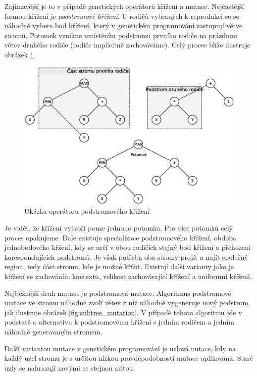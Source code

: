 Zajímavější je to v případě genetických operátorů křížení a mutace. Nejčastější formou
křížení je \textit{podstromové křížení}. U rodičů vybraných k reprodukci se se náhodně 
vybere bod křížení, který v genetickém programování zastupují větve stromu. Potomek
vznikne umístěním podstromu prvního rodiče na prázdnou větev druhého rodiče (rodiče
implicitně zachováváme). Celý proces blíže ilustruje obrázek \ref{fig:tree_crossover}

\begin{figure}[!ht]
	\centering
	\includegraphics[scale=0.6]{fig/tree_crossover}	
	\caption{Ukázka operátoru podstromového křížení}
	\label{fig:tree_crossover}
\end{figure}

Je vidět, že křížení vytvoří pouze jednoho potomka. Pro více potomků celý proces 
opakujeme. Dale existuje specializace podstromového křížení, obdoba jednobodového
křžení, kdy se určí v obou rodičích stejný bod křížení a přehození korespondujících
podstromů. Je však potřeba oba stromy projít a najít společný region, tedy část stromu,
kde je možné křížit. Existují další varianty jako je křížení se zachováním kontextu, 
velikost zachovávající křížení a uniformní křížení.

Nejběžnější druh mutace je podstromová mutace. Algoritmus podstromové mutace ve stromu
náhodně zvolí větev z níž náhodně vygeneruje nový podstrom, jak ilustruje obrázek
\ref{fig:subtree_mutation}. V případě tohoto algoritmu jde v podstatě o alternativu k
podstromovému křížení s jedním rodičem a jedním náhodně generovaným stromem.

Další variantou mutace v genetickém programování je uzlová nutace, kdy na každý
uzel stromu je s určitou nízkou pravděpodobností mutace aplikována. Staré uzly
se nahrazují novými se stejnou aritou.

